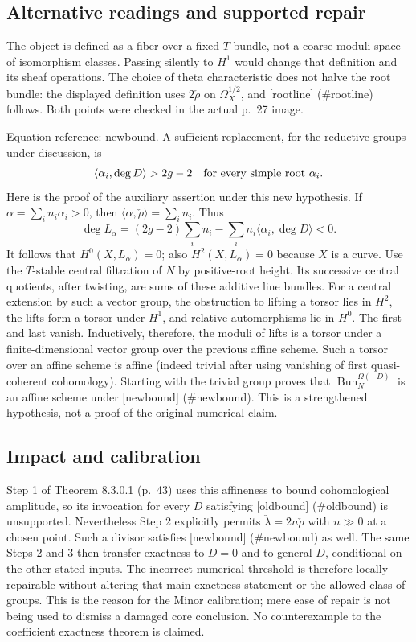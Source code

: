 \documentclass[10pt]{article}
\begin{document}
\subsection*{Alternative readings and supported repair}
The object is defined as a fiber over a fixed \(T\)-bundle, not a coarse moduli space of isomorphism classes. Passing silently to \(H^1\) would change that definition and its sheaf operations. The choice of theta characteristic does not halve the root bundle: the displayed definition uses \(2\check\rho\) on \(\Omega_X^{1/2}\), and [rootline] (\#rootline) follows. Both points were checked in the actual p. 27 image.\par
Equation reference: newbound. A sufficient replacement, for the reductive groups under discussion, is \[
 \langle\alpha_i,\deg D\rangle>2g-2
 \quad\hbox{for every simple root }\alpha_i.\] Here is the proof of the auxiliary assertion under this new hypothesis. If \(\alpha=\sum_i n_i\alpha_i>0\), then \(\langle\alpha,\check\rho\rangle=\sum_i n_i\). Thus \[\deg L_\alpha
 =(2g-2)\sum_i n_i-\sum_i n_i
       \langle\alpha_i,\deg D\rangle<0.\] It follows that \(H^0(X,L_\alpha)=0\); also \(H^2(X,L_\alpha)=0\) because \(X\) is a curve. Use the \(T\)-stable central filtration of \(N\) by positive-root height. Its successive central quotients, after twisting, are sums of these additive line bundles. For a central extension by such a vector group, the obstruction to lifting a torsor lies in \(H^2\), the lifts form a torsor under \(H^1\), and relative automorphisms lie in \(H^0\). The first and last vanish. Inductively, therefore, the moduli of lifts is a torsor under a finite-dimensional vector group over the previous affine scheme. Such a torsor over an affine scheme is affine (indeed trivial after using vanishing of first quasi-coherent cohomology). Starting with the trivial group proves that \(\operatorname{Bun}_N^{\Omega(-D)}\) is an affine scheme under [newbound] (\#newbound). This is a strengthened hypothesis, not a proof of the original numerical claim.\par
\subsection*{Impact and calibration}
Step 1 of Theorem 8.3.0.1 (p. 43) uses this affineness to bound cohomological amplitude, so its invocation for every \(D\) satisfying [oldbound] (\#oldbound) is unsupported. Nevertheless Step 2 explicitly permits \(\check\lambda=2n\check\rho\) with \(n\gg0\) at a chosen point. Such a divisor satisfies [newbound] (\#newbound) as well. The same Steps 2 and 3 then transfer exactness to \(D=0\) and to general \(D\), conditional on the other stated inputs. The incorrect numerical threshold is therefore locally repairable without altering that main exactness statement or the allowed class of groups. This is the reason for the Minor calibration; mere ease of repair is not being used to dismiss a damaged core conclusion. No counterexample to the coefficient exactness theorem is claimed.\par
\end{document}
